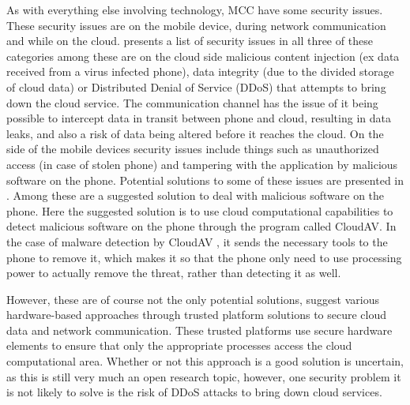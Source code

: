 As with everything else involving technology, MCC have some security issues.
These security issues are on the mobile device, during network communication and while on the cloud.
\citet{6923101} presents a list of security issues in all three of these categories among these are on the cloud side malicious content injection (ex data received from a virus infected phone), data integrity (due to the divided storage of cloud data) or Distributed Denial of Service (DDoS) that attempts to bring down the cloud service.
The communication channel has the issue of it being possible to intercept data in transit between phone and cloud, resulting in data leaks, and also a risk of data being altered before it reaches the cloud.
On the side of the mobile devices security issues include things such as unauthorized access (in case of stolen phone) and tampering with the application by malicious software on the phone.
Potential solutions to some of these issues are presented in \citet{6583635}.
Among these are a suggested solution to deal with malicious software on the phone.
Here the suggested solution is to use cloud computational capabilities to detect malicious software on the phone through the program called CloudAV.
In the case of malware detection by CloudAV \citep{Oberheide:2008:CNA:1496711.1496718}, it sends the necessary tools to the phone to remove it, which makes it so that the phone only need to use processing power to actually remove the threat, rather than detecting it as well.

However, these are of course not the only potential solutions, \citet{7056876} suggest various hardware-based approaches through trusted platform solutions to secure cloud data and network communication.
These trusted platforms use secure hardware elements to ensure that only the appropriate processes access the cloud computational area.
Whether or not this approach is a good solution is uncertain, as this is still very much an open research topic, however, one security problem it is not likely to solve is the risk of DDoS attacks to bring down cloud services.

